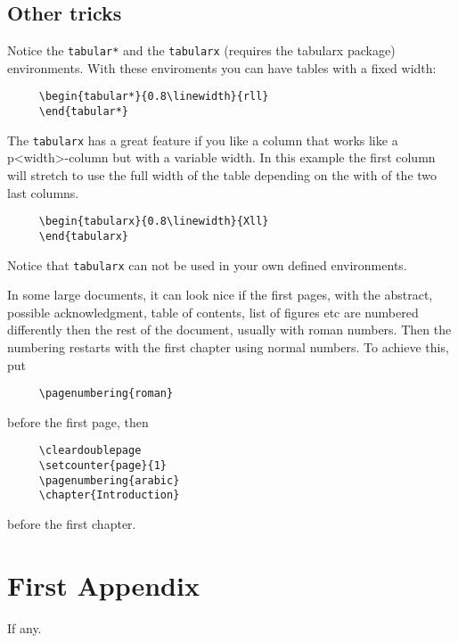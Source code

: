 \documentclass[a4paper,11pt,twoside]{report}
\begin{document}
\section{Other tricks}

Notice the \texttt{tabular*} and the \texttt{tabularx} (requires the 
tabularx package) environments. With these enviroments you can have tables 
with a fixed width: 
\begin{verbatim}
     \begin{tabular*}{0.8\linewidth}{rll}
     \end{tabular*}
\end{verbatim}
The \texttt{tabularx} has a great feature if you like a column that works
like a p{<width>}-column but with a variable width. In this example
the first column will stretch to use the full width of the table
depending on the with of the two last columns. 
\begin{verbatim}
     \begin{tabularx}{0.8\linewidth}{Xll}
     \end{tabularx}
\end{verbatim}
Notice that \texttt{tabularx} can not be used in your own defined
environments. 


In some large documents, it can look nice if the first pages, with
the abstract, possible acknowledgment, table of contents, list of
figures etc are numbered differently then the rest of the document,
usually with roman numbers. Then the numbering restarts with the
first chapter using normal numbers. To achieve this, put 
\begin{verbatim}
     \pagenumbering{roman}
\end{verbatim}
before the first page, then
\begin{verbatim}
     \cleardoublepage
     \setcounter{page}{1}
     \pagenumbering{arabic}
     \chapter{Introduction}
\end{verbatim}
before the first chapter.



\cleardoublepage

%
%



\appendix

\chapter{First Appendix}

If any.
\end{document}
